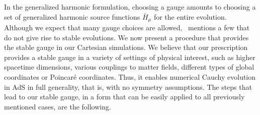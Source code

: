 \documentclass[a4paper,11pt]{article}
\numberwithin{equation}{section}
\begin{document}
In the generalized harmonic formulation, choosing a gauge amounts to choosing a set of generalized harmonic source functions $\bar{H}_\mu$ for the entire evolution. Although we expect that many gauge choices are allowed,~\cite{Bantilan:2012vu} mentions a few that do not give rise to stable evolutions. We now present a procedure that provides the stable gauge in our Cartesian simulations. We believe that our prescription provides a stable gauge in a variety of settings of physical interest, such as higher spacetime dimensions, various couplings to matter fields, different types of global coordinates or Poincar\'{e} coordinates. Thus, it enables numerical Cauchy evolution in AdS in full generality, that is, with no symmetry assumptions.
The steps that lead to our stable gauge, in a form that can be easily applied to all previously mentioned cases, are the following.
\end{document}

